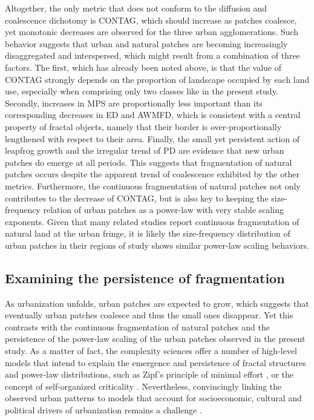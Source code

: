 Altogether, the only metric that does not conform to the diffusion and coalescence dichotomy is CONTAG, which should increase as patches coalesce, yet monotonic decreases are observed for the three urban agglomerations. Such behavior suggests that urban and natural patches are becoming increasingly disaggregated and interspersed, which might result from a combination of three factors.
The first, which has already been noted above, is that the value of CONTAG strongly depends on the proportion of landscape occupied by each land use, especially when comprising only two classes like in the present study.
Secondly, increases in MPS are proportionally less important than its corresponding decreases in ED and AWMFD, which is consistent with a central property of fractal objects, namely that their border is over-proportionally lengthened with respect to their area.
Finally, the small yet persistent action of leapfrog growth and the irregular trend of PD are evidence that new urban patches do emerge at all periods.
This suggests that fragmentation of natural patches occurs despite the apparent trend of coalescence exhibited by the other metrics.
Furthermore, the continuous fragmentation of natural patches not only contributes to the decrease of CONTAG, but is also key to keeping the size-frequency relation of urban patches as a power-law with very stable scaling exponents.
Given that many related studies report continuous fragmentation of natural land at the urban fringe, it is likely the size-frequency distribution of urban patches in their regions of study shows similar power-law scaling behaviors.


\subsection*{Examining the persistence of fragmentation}

As urbanization unfolds, urban patches are expected to grow, which suggests that eventually urban patches coalesce and thus the small ones disappear. Yet this contrasts with the continuous fragmentation of natural patches and the persistence of the power-law scaling of the urban patches observed in the present study.
As a matter of fact, the complexity sciences offer a number of high-level models that intend to explain the emergence and persistence of fractal structures and power-law distributions, such as Zipf's principle of minimal effort \citep{zipf1949human}, or the concept of self-organized criticality \citep{bak1988self}.
Nevertheless, convincingly linking the observed urban patterns to models that account for socioeconomic, cultural and political drivers of urbanization remains a challenge \citep{batty2001modelling, manson2006complexity}. 

